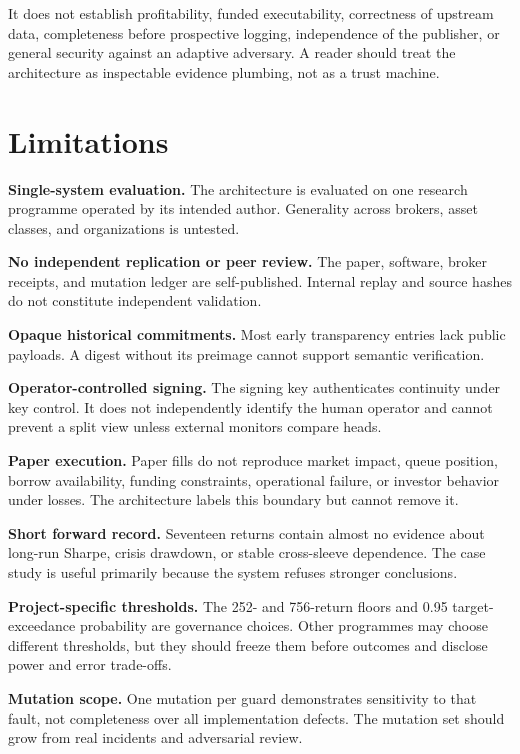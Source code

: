 \documentclass[11pt]{article}
\begin{document}
It does not establish profitability, funded executability, correctness of upstream data, completeness before prospective logging, independence of the publisher, or general security against an adaptive adversary. A reader should treat the architecture as inspectable evidence plumbing, not as a trust machine.

\section{Limitations}

\textbf{Single-system evaluation.} The architecture is evaluated on one research programme operated by its intended author. Generality across brokers, asset classes, and organizations is untested.

\textbf{No independent replication or peer review.} The paper, software, broker receipts, and mutation ledger are self-published. Internal replay and source hashes do not constitute independent validation.

\textbf{Opaque historical commitments.} Most early transparency entries lack public payloads. A digest without its preimage cannot support semantic verification.

\textbf{Operator-controlled signing.} The signing key authenticates continuity under key control. It does not independently identify the human operator and cannot prevent a split view unless external monitors compare heads.

\textbf{Paper execution.} Paper fills do not reproduce market impact, queue position, borrow availability, funding constraints, operational failure, or investor behavior under losses. The architecture labels this boundary but cannot remove it.

\textbf{Short forward record.} Seventeen returns contain almost no evidence about long-run Sharpe, crisis drawdown, or stable cross-sleeve dependence. The case study is useful primarily because the system refuses stronger conclusions.

\textbf{Project-specific thresholds.} The 252- and 756-return floors and 0.95 target-exceedance probability are governance choices. Other programmes may choose different thresholds, but they should freeze them before outcomes and disclose power and error trade-offs.

\textbf{Mutation scope.} One mutation per guard demonstrates sensitivity to that fault, not completeness over all implementation defects. The mutation set should grow from real incidents and adversarial review.
\end{document}
